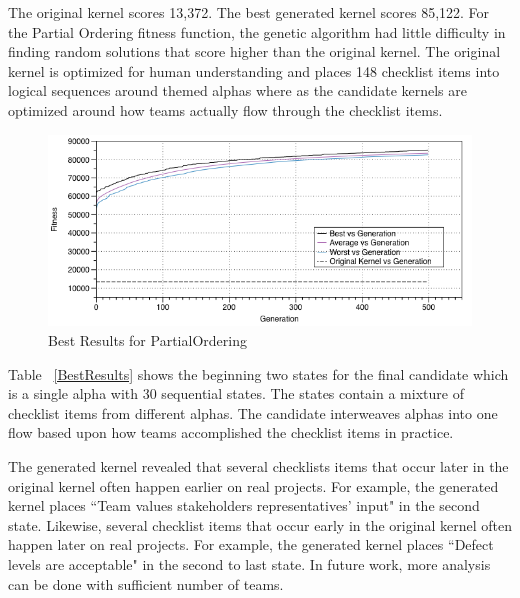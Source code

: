 \documentclass[conference]{IEEEtran}
\begin{document}
The original kernel scores 13,372. The best generated kernel scores 85,122. For the Partial Ordering fitness function, the genetic algorithm had little difficulty in finding random solutions that score higher than the original kernel. The original kernel is optimized for human understanding and places 148 checklist items into logical sequences around themed alphas where as the candidate kernels are optimized around how teams actually flow through the checklist items.

\begin{figure}[ht]
\includegraphics[scale=0.74]{images/best_results_partial_ordering_500gens_40runs}
\caption{Best Results for PartialOrdering}
\label{BestResultsPartialOrdering}
\end{figure}

Table ~\ref{BestResults} shows the beginning two states for the final candidate which is a single alpha with 30 sequential states. The states contain a mixture of checklist items from different alphas. The candidate interweaves alphas into one flow based upon how teams accomplished the checklist items in practice. 

The generated kernel revealed that several checklists items that occur later in the original kernel often happen earlier on real projects. For example, the generated kernel places ``Team values stakeholders representatives' input" in the second state. Likewise, several checklist items that occur early in the original kernel often happen later on real projects. For example, the generated kernel places ``Defect levels are acceptable" in the second to last state. In future work, more analysis can be done with sufficient number of teams.
\end{document}
